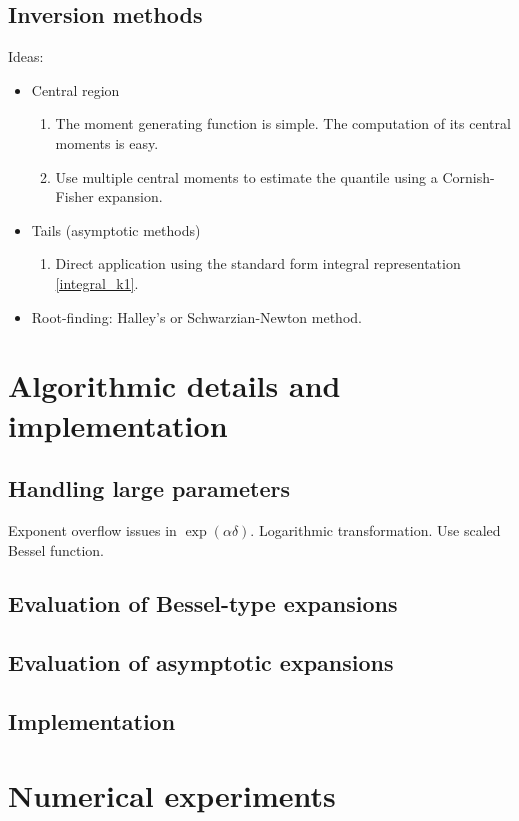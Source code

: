 \documentclass[10pt,a4paper,oneside]{article}
\numberwithin{equation}{section}
\begin{document}
\subsection{Inversion methods}
Ideas:
\begin{itemize}
\item Central region
\begin{enumerate}
\item The moment generating function is simple. The computation of its central moments is easy.
\item Use multiple central moments to estimate the quantile using a Cornish-Fisher expansion.
\end{enumerate}
\item Tails (asymptotic methods) \cite[\S 42]{Temme2015}
\begin{enumerate}
\item Direct application using the standard form integral representation \eqref{integral_k1}.
\end{enumerate}
\item Root-finding: Halley's or Schwarzian-Newton method.
\end{itemize}

\section{Algorithmic details and implementation}
\subsection{Handling large parameters}
Exponent overflow issues in $\exp(\alpha \delta)$. Logarithmic transformation. Use scaled Bessel function.
\subsection{Evaluation of Bessel-type expansions}

\subsection{Evaluation of asymptotic expansions}

\subsection{Implementation}


\section{Numerical experiments}
\end{document}
